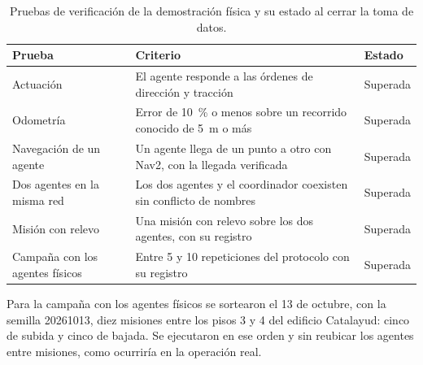 \begin{table}[H]
  \centering\footnotesize
  \caption{Pruebas de verificación de la demostración física y su estado al
    cerrar la toma de datos.}
  \label{tab:pruebas-verificacion}
  \begin{tabular}{@{}p{}p{}p{}@{}}
    \toprule
    \textbf{Prueba} & \textbf{Criterio} & \textbf{Estado} \\ \midrule
    Actuación & El agente responde a las órdenes de dirección y tracción & Superada \\
    Odometría & Error de 10~\% o menos sobre un recorrido conocido de 5~m o más & Superada \\
    Navegación de un agente & Un agente llega de un punto a otro con Nav2, con la llegada verificada & Superada \\
    Dos agentes en la misma red & Los dos agentes y el coordinador coexisten sin conflicto de nombres & Superada \\
    Misión con relevo & Una misión con relevo sobre los dos agentes, con su registro & Superada \\
    Campaña con los agentes físicos & Entre 5 y 10 repeticiones del protocolo con su registro & Superada \\ \bottomrule
  \end{tabular}
\end{table}

Para la campaña con los agentes físicos se sortearon el 13 de octubre, con la semilla 20261013, diez misiones entre los pisos 3 y 4 del edificio Catalayud: cinco de subida y cinco de bajada. Se ejecutaron en ese orden y sin reubicar los agentes entre misiones, como ocurriría en la operación real.

